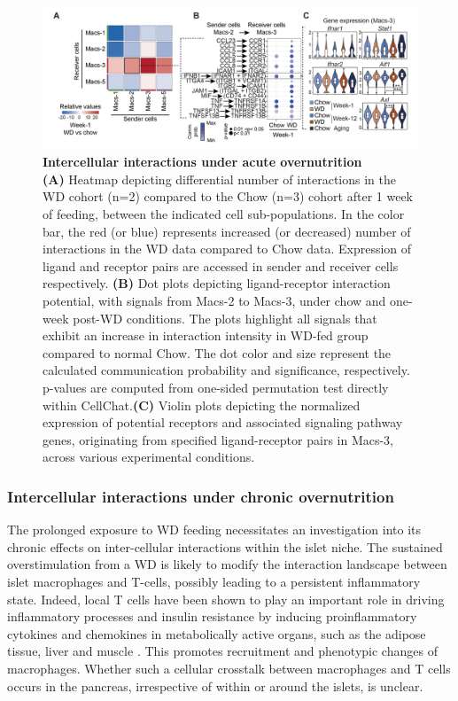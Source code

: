 \begin{figure}[!t]
\centering
\includegraphics[width=\linewidth]{Chapter4/Fig/F2-6-01.png}
\caption[res-cciw1]{\textbf{Intercellular interactions under acute overnutrition}\\
\textbf{(A)} Heatmap depicting differential number of interactions in the WD cohort (n=2) compared to the Chow (n=3) cohort after 1 week of feeding, between the indicated cell sub-populations. In the color bar, the red (or blue) represents increased (or decreased) number of interactions in the WD data compared to Chow data. Expression of ligand and receptor pairs are accessed in sender and receiver cells respectively. \textbf{(B)} Dot plots depicting ligand-receptor interaction potential, with signals from Macs-2 to Macs-3, under chow and one-week post-WD conditions. The plots highlight all signals that exhibit an increase in interaction intensity in WD-fed group compared to normal Chow. The dot color and size represent the calculated communication probability and significance, respectively. p-values are computed from one-sided permutation test directly within CellChat.\textbf{(C)} Violin plots depicting the normalized expression of potential receptors and associated signaling pathway genes, originating from specified ligand-receptor pairs in Macs-3, across various experimental conditions.
}
\label{fig2-6}
\end{figure}

\subsubsection{Intercellular interactions under chronic overnutrition}
The prolonged exposure to WD feeding necessitates an investigation into its chronic effects on inter-cellular interactions within the islet niche. The sustained overstimulation from a WD is likely to modify the interaction landscape between islet macrophages and T-cells, possibly leading to a persistent inflammatory state. Indeed, local T cells have been shown to play an important role in driving inflammatory processes and insulin resistance by inducing proinflammatory cytokines and chemokines in metabolically active organs, such as the adipose tissue, liver and muscle \textbf{\cite{FIND}}. This promotes recruitment and phenotypic changes of macrophages. Whether such a cellular crosstalk between macrophages and T cells occurs in the pancreas, irrespective of within or around the islets, is unclear.

